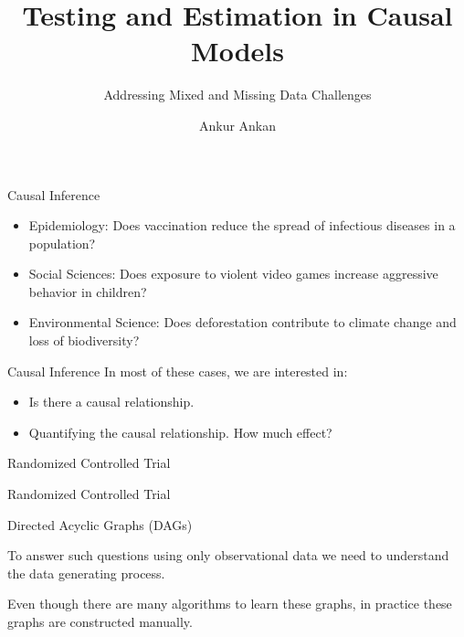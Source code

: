 \documentclass[aspectratio=169]{beamer}
\begin{document}
\title{Testing and Estimation in Causal Models}
\subtitle{Addressing Mixed and Missing Data Challenges}
\author{Ankur Ankan}
\date{}

\maketitle

\begin{frame}{Causal Inference}

	\begin{itemize}
		\item Epidemiology: Does vaccination reduce the spread of infectious diseases in a population?
		\item Social Sciences: Does exposure to violent video games increase aggressive behavior in children?
		\item Environmental Science: Does deforestation contribute to climate change and loss of biodiversity?
	\end{itemize}
\end{frame}

\begin{frame}{Causal Inference}
	In most of these cases, we are interested in:
	\begin{itemize}
		\item Is there a causal relationship.
		\item Quantifying the causal relationship. How much effect?
	\end{itemize}
\end{frame}

\begin{frame}{Randomized Controlled Trial}
\end{frame}

\begin{frame}{Randomized Controlled Trial}

\end{frame}

\begin{frame}{Directed Acyclic Graphs (DAGs)}
	
	To answer such questions using only observational data we need to understand the data generating process.


	Even though there are many algorithms to learn these graphs, in practice these graphs are constructed manually.
\end{frame}
\end{document}
